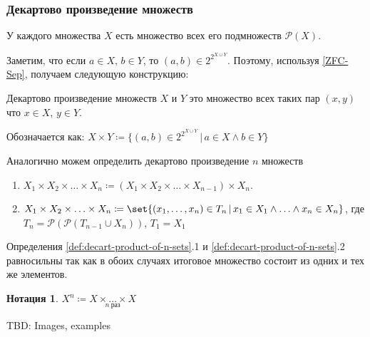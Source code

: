 \documentclass{article}
\newtheorem*{defnotation}{Нотация}
\newcommand{\powerset}{\mathcal{P}}
\begin{document}
\subsubsection{Декартово произведение множеств}
    У каждого множества \(X\) есть множество всех его подмножеств \(\powerset(X)\). 

    Заметим, что если \(a \in X,\, b \in Y\), то \((a, b) \in 2^{2^{X \cup Y}}\). Поэтому, используя \ref{ZFC-Sep}, получаем следующую конструкцию: 
    \begin{definition}
        \label{def:decart-product}
        Декартово произведение множеств \(X\) и \(Y\) это множество всех таких пар \((x, y)\) что \(x \in X\), \(y \in Y\). 
        
        Обозначается как: \(X \times Y \coloneq \{(a,b) \in 2^{2^{X \cup Y}}\,|\, a \in X \land b \in Y\}\)
    \end{definition}
    \begin{definition}
        \label{def:decart-product-of-n-sets}
        Аналогично можем определить декартово произведение \(n\) множеств
        \begin{enumerate}
            \item \(X_1 \times X_2 \times\ldots\times X_n \coloneq (X_1 \times X_2 \times\ldots\times X_{n-1})\times X_n\).
            \item \(X_1 \times X_2 \times\ldots\times X_n \coloneq \set{(x_1,\ldots,x_n) \in T_n\,|\, x_1 \in X_1 \land\ldots\land x_n \in X_n}\), где \(T_n = \powerset(\powerset(T_{n-1}\cup X_n))\), \(T_1 = X_1\)
        \end{enumerate}
    \end{definition}
    \begin{remark}
        \label{rem:equal-defs-of-decart-product}
        Определения \ref{def:decart-product-of-n-sets}.1 и  \ref{def:decart-product-of-n-sets}.2 равносильны так как в обоих случаях итоговое множество состоит из одних и тех же элементов.
    \end{remark}
    \begin{defnotation}
        \(X^n \coloneq \underset{n\ \text{раз}}{X \times\ldots\times X}\)
    \end{defnotation}

    TBD: Images, examples

    
\end{document}
